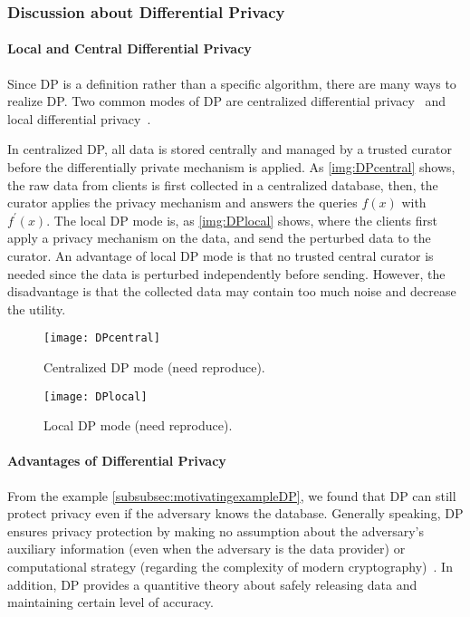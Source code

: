 

\subsubsection{Discussion about Differential Privacy}

\paragraph{Local and Central Differential Privacy}
Since DP is a definition rather than a specific algorithm, there are many ways to realize DP. Two common modes of DP are centralized differential privacy~\cite{dwork2014algorithmic} and local differential privacy~\cite{dinur2003revealing}.

In centralized DP, all data is stored centrally and managed by a trusted curator before the differentially private mechanism is applied. As \autoref{img:DPcentral} shows, the raw data from clients is first collected in a centralized database, then, the curator applies the privacy mechanism and answers the queries $f\left(x\right)$ with $f^{\prime}\left(x\right)$.
The local DP mode is, as \autoref{img:DPlocal} shows, where the clients first apply a privacy mechanism on the data, and send the perturbed data to the curator.
An advantage of local DP mode is that no trusted central curator is needed since the data is perturbed independently before sending. However, the disadvantage is that the collected data may contain too much noise and decrease the utility.

\begin{figure}[htbp]
    \texttt{[image: DPcentral]}
    \centering
    \caption{Centralized DP mode (need reproduce).}
    \label{img:DPcentral}
\end{figure}
\FloatBarrier

\begin{figure}[htbp]
    \texttt{[image: DPlocal]}
    \centering
    \caption{Local DP mode (need reproduce).}
    \label{img:DPlocal}
\end{figure}
\FloatBarrier


\paragraph{Advantages of Differential Privacy}
From the example \autoref{subsubsec:motivatingexampleDP}, we found that DP can still protect privacy even if the adversary knows the database. Generally speaking, DP ensures privacy protection by making no assumption about the adversary's auxiliary information (even when the adversary is the data provider) or computational strategy (regarding the complexity of modern cryptography)~\cite{vadhan2017complexity}. In addition, DP provides a quantitive theory about safely releasing data and maintaining certain level of accuracy.

